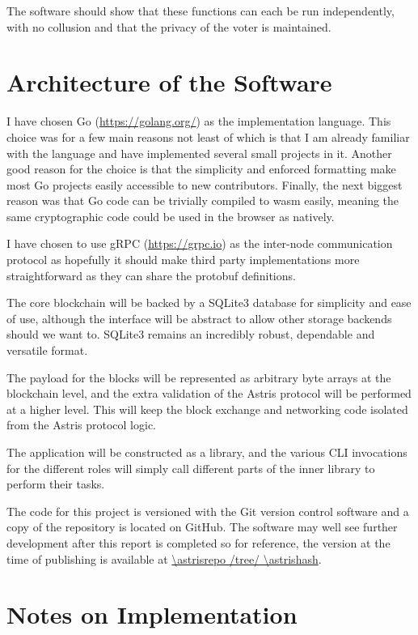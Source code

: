 The software should show that these functions can each be run independently, with no collusion and that the privacy of the voter is maintained.

\section{Architecture of the Software}
\label{ch:sw:architecture}

I have chosen Go (\url{https://golang.org/}) as the implementation language. This choice was for a few main reasons not least of which is that I am already familiar with the language and have implemented several small projects in it. Another good reason for the choice is that the simplicity and enforced formatting make most Go projects easily accessible to new contributors. Finally, the next biggest reason was that Go code can be trivially compiled to \gls{wasm} easily, meaning the same cryptographic code could be used in the browser as natively.

I have chosen to use gRPC (\url{https://grpc.io}) as the inter-node communication protocol as hopefully it should make third party implementations more straightforward as they can share the protobuf definitions.

The core blockchain will be backed by a SQLite3 database for simplicity and ease of use, although the interface will be abstract to allow other storage backends should we want to. SQLite3 remains an incredibly robust, dependable and versatile format.

The payload for the blocks will be represented as arbitrary byte arrays at the blockchain level, and the extra validation of the Astris protocol will be performed at a higher level. This will keep the block exchange and networking code isolated from the Astris protocol logic.

The application will be constructed as a library, and the various CLI invocations for the different roles will simply call different parts of the inner library to perform their tasks.

The code for this project is versioned with the Git version control software and a copy of the repository is located on GitHub. The software may well see further development after this report is completed so for reference, the version at the time of publishing is available at \url{\astrisrepo /tree/ \astrishash}.

\section{Notes on Implementation}
\label{ch:sw:notes}

